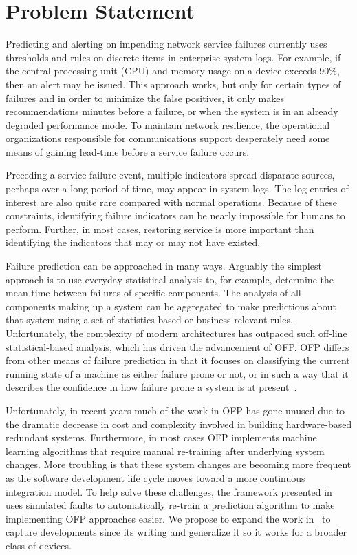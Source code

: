 \section{Problem Statement}
Predicting and alerting on impending network service failures currently uses
thresholds and rules on discrete items in enterprise system logs.  For example,
if the central processing unit (CPU) and memory usage on a device exceeds 90\%,
then an alert may be issued.  This approach works, but only for certain types
of failures and in order to minimize the false positives, it only makes
recommendations minutes before a failure, or when the system is in an already
degraded performance mode.  To maintain network resilience, the operational
organizations responsible for communications support desperately need some
means of gaining lead-time before a service failure occurs.  

Preceding a service failure event, multiple indicators spread disparate
sources, perhaps over a long period of time, may appear in system logs.  The
log entries of interest are also quite rare compared with normal operations.
Because of these constraints, identifying failure indicators can be nearly
impossible for humans to perform.  Further, in most cases, restoring service is
more important than identifying the indicators that may or may not have
existed.  

Failure prediction can be approached in many ways. Arguably the simplest
approach is to use everyday statistical analysis to, for example, determine the
mean time between failures of specific components. The analysis of all
components making up a system can be aggregated to make predictions about that
system using a set of statistics-based or business-relevant rules.
Unfortunately, the complexity of modern architectures has outpaced such
off-line statistical-based analysis, which has driven the advancement of OFP.
OFP differs from other means of failure prediction in that it focuses on
classifying the current running state of a machine as either failure prone or
not, or in such a way that it describes the confidence in how failure prone a
system is at present~\cite{salfnerSurvey}.

Unfortunately, in recent years much of the work in OFP has gone unused due to
the dramatic decrease in cost and complexity involved in building
hardware-based redundant systems.  Furthermore, in most cases OFP implements
machine learning algorithms that require manual re-training after underlying
system changes.  More troubling is that these system changes are becoming more
frequent as the software development life cycle moves toward a more continuous
integration model.  To help solve these challenges, the framework presented
in~\cite{irrera2015} uses simulated faults to automatically re-train a
prediction algorithm to make implementing OFP approaches easier.  We propose to
expand the work in~\cite{irrera2015} to capture developments since its writing
and generalize it so it works for a broader class of devices.

